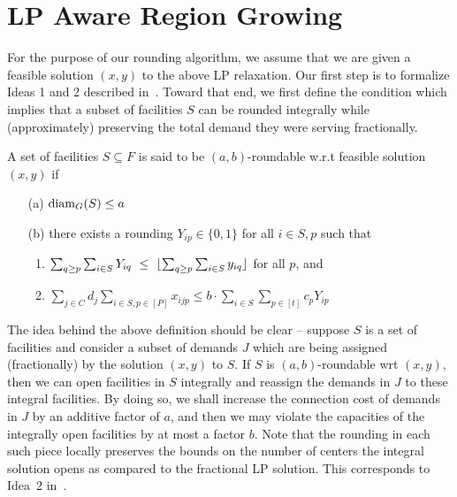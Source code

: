 \section{LP Aware Region Growing}
For the purpose of our rounding algorithm, we assume that we are given a feasible solution $(x,y)$ to the above LP relaxation. Our first step is to formalize Ideas 1 and 2 described in~. Toward that end, we first define the condition which implies that a subset of facilities $S$ can be rounded integrally while (approximately) preserving the total demand they were serving fractionally.

\begin{definition}\label{def:rnding-mkc}
	A set of facilities $S\subseteq F$ is said to be $(a,b)$-roundable w.r.t feasible solution $(x,y)$ if
	\begin{itemize}%
		\item[(a)] $\mathrm{diam}_G(S) \leq a$
		\item[(b)] there exists a rounding $Y_{ip} \in \{0,1\}$ for all $i \in S, p$ such that
		\begin{enumerate}
			\item $\sum_{q \geq p} \sum_{i\in S} Y_{iq} ~\leq~\lfloor\sum_{q \geq p}\sum_{i\in S} y_{iq}\rfloor$ for all $p$, and
			\item $\sum_{j\in C} d_j \sum_{i\in S,p\in [P]} x_{ijp} \leq b\cdot \sum_{i\in S} \sum_{p\in [t]} c_p Y_{ip}$
		\end{enumerate}
	\end{itemize}
\end{definition}
The idea behind the above definition should be clear -- suppose $S$ is a set of facilities and consider a subset of demands $J$ which are being assigned (fractionally) by
the solution $(x,y)$ to $S$. If $S$ is $(a,b)$-roundable wrt $(x,y)$, then we can open facilities in $S$ integrally and reassign the demands in $J$ to these integral
facilities. By doing so, we shall increase the connection cost of demands in $J$ by an additive factor of $a$, and then we may violate the capacities of the integrally open
facilities by at most a factor $b$. Note that the rounding in each such piece locally preserves the bounds on the number of centers the integral solution opens as compared to the fractional LP solution. This corresponds to Idea~2 in~.


